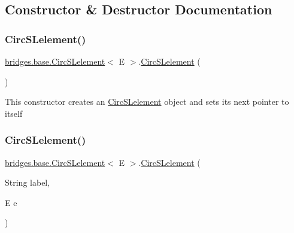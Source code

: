 \subsection{Constructor \& Destructor Documentation}
\mbox{\label{classbridges_1_1base_1_1_circ_s_lelement_a4a5a58cc7a0ec5170a828861c11df1b3}} 
\subsubsection{\texorpdfstring{Circ\+S\+Lelement()}{CircSLelement()}\hspace{0.1cm}{\footnotesize\ttfamily [1/4]}}
{\footnotesize\ttfamily \mbox{\hyperlink{classbridges_1_1base_1_1_circ_s_lelement}{bridges.\+base.\+Circ\+S\+Lelement}}$<$ E $>$.\mbox{\hyperlink{classbridges_1_1base_1_1_circ_s_lelement}{Circ\+S\+Lelement}} (\begin{DoxyParamCaption}{ }\end{DoxyParamCaption})}

This constructor creates an \mbox{\hyperlink{classbridges_1_1base_1_1_circ_s_lelement}{Circ\+S\+Lelement}} object and sets its next pointer to itself \mbox{\label{classbridges_1_1base_1_1_circ_s_lelement_a213d61713e51295d756669def911f080}} 
\subsubsection{\texorpdfstring{Circ\+S\+Lelement()}{CircSLelement()}\hspace{0.1cm}{\footnotesize\ttfamily [2/4]}}
{\footnotesize\ttfamily \mbox{\hyperlink{classbridges_1_1base_1_1_circ_s_lelement}{bridges.\+base.\+Circ\+S\+Lelement}}$<$ E $>$.\mbox{\hyperlink{classbridges_1_1base_1_1_circ_s_lelement}{Circ\+S\+Lelement}} (\begin{DoxyParamCaption}\item[{String}]{label,  }\item[{E}]{e }\end{DoxyParamCaption})}

